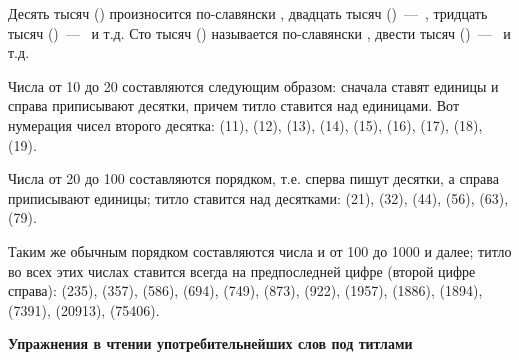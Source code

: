 \documentclass[11pt,a4paper,oneside]{memoir}
\newcommand{\exercise}{}
\begin{document}
    \bigskip
    Десять тысяч ({}) произносится по-славянски {}, двадцать тысяч ({})~---~{}, тридцать тысяч ({})~---~{} и т.д. Сто тысяч ({}) называется по-славянски {}, двести тысяч ({})~---~{} и т.д.
    
    Числа от 10 до 20 составляются следующим образом: сначала ставят единицы и справа приписывают десятки, причем титло ставится над единицами. Вот нумерация чисел второго десятка: {} (11), {} (12), {} (13), {} (14), {} (15), {} (16), {} (17), {} (18), {} (19).
    
    Числа от 20 до 100 составляются порядком, т.е. сперва пишут десятки, а справа приписывают единицы; титло ставится над десятками: {} (21), {} (32), {} (44), {} (56), {} (63), {} (79).
    
    Таким же обычным порядком составляются числа и от 100 до 1000 и далее; титло во всех этих числах ставится всегда на предпоследней цифре (второй цифре справа): {} (235), {} (357), {} (586), {} (694), {} (749), {} (873), {} (922), {} (1957), {} (1886), {} (1894), {} (7391), {} (20913), {} (75406).
    \bigskip
    \pagebreak

    \textbf{Упражнения в чтении употребительнейших слов под титлами}

                    \paragraph{\exercise}
    
\end{document}
